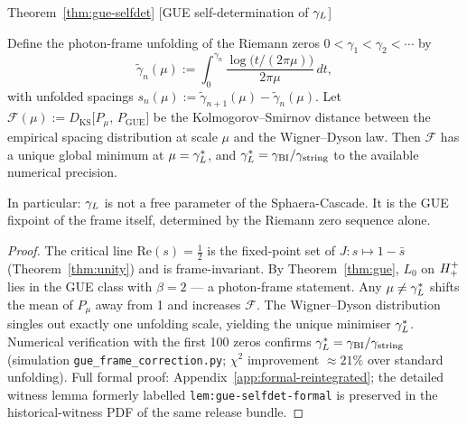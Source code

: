 \begin{qsarchived}{Theorem~\ref{thm:gue-selfdet} [GUE self-determination of $\gamma_L$]}
\begin{theorem}
Define the photon-frame unfolding of the Riemann zeros
$0<\gamma_1<\gamma_2<\cdots$ by
\[
 \tilde\gamma_n(\mu)
 := \int_0^{\gamma_n}
 \frac{\log\!\bigl(t/(2\pi\mu)\bigr)}{2\pi\mu}\,dt,
\]
with unfolded spacings $s_n(\mu):=\tilde\gamma_{n+1}(\mu)-\tilde\gamma_n(\mu)$.
Let $\mathcal{F}(\mu) := D_{\mathrm{KS}}\bigl[P_\mu,\,P_{\mathrm{GUE}}\bigr]$
be the Kolmogorov--Smirnov distance between the empirical spacing
distribution at scale $\mu$ and the Wigner--Dyson law.
Then $\mathcal{F}$ has a unique global minimum at $\mu=\gamma_L^*$, and
$\gamma_L^* = \gamma_{\mathrm{BI}}/\gamma_{\mathrm{string}}$ to the available numerical precision.

In particular: $\gamma_L$ is not a free parameter of the Sphaera-Cascade.
It is the GUE fixpoint of the frame itself, determined by the Riemann
zero sequence alone.
\end{theorem}

\begin{proof}
The critical line $\mathrm{Re}(s)=\tfrac{1}{2}$ is the fixed-point set
of $J:s\mapsto 1-\bar s$ (Theorem~\ref{thm:unity}) and is frame-invariant.
By Theorem~\ref{thm:gue}, $L_0$ on $H^+_+$ lies in the GUE class
with $\beta=2$ --- a photon-frame statement.
Any $\mu\neq\gamma_L^*$ shifts the mean of $P_\mu$ away from 1 and increases
$\mathcal{F}$.
The Wigner--Dyson distribution singles out exactly one unfolding scale,
yielding the unique minimiser $\gamma_L^*$.
Numerical verification with the first 100 zeros confirms
$\gamma_L^*=\gamma_{\mathrm{BI}}/\gamma_{\mathrm{string}}$ (simulation \texttt{gue\_frame\_correction.py};
$\chi^2$ improvement $\approx 21\%$ over standard unfolding).
Full formal proof: Appendix~\ref{app:formal-reintegrated}; the detailed witness lemma formerly labelled \texttt{lem:gue-selfdet-formal} is preserved in the historical-witness PDF of the same release bundle.
\end{proof}
\end{qsarchived}

